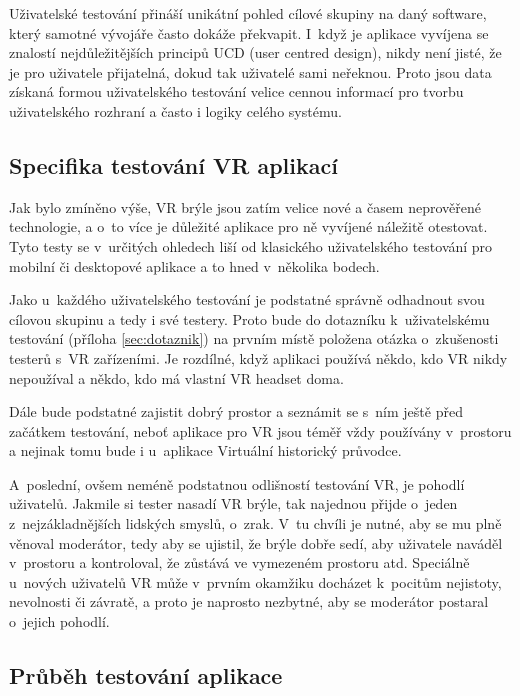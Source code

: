 \documentclass[thesis=B,czech]{FITthesis}[2012/06/26]
\begin{document}
	 Uživatelské testování přináší unikátní pohled cílové skupiny na daný software, který samotné vývojáře často dokáže překvapit. I~když je aplikace vyvíjena se znalostí nejdůležitějších principů UCD (user centred design), nikdy není jisté, že je pro uživatele přijatelná, dokud tak uživatelé sami neřeknou. Proto jsou data získaná formou uživatelského testování velice cennou informací pro tvorbu uživatelského rozhraní a často i logiky celého systému.
	
	\subsection{Specifika testování VR aplikací}
	
	Jak bylo zmíněno výše, VR brýle jsou zatím velice nové a časem neprověřené technologie, a o~to více je důležité aplikace pro ně vyvíjené náležitě otestovat. Tyto testy se v~určitých ohledech liší od klasického uživatelského testování pro mobilní či desktopové aplikace a to hned v~několika bodech.
	
	 Jako u~každého uživatelského testování je podstatné správně odhadnout svou cílovou skupinu a tedy i své testery. Proto bude do dotazníku k~uživatelskému testování (příloha \ref{sec:dotaznik}) na prvním místě položena otázka o~zkušenosti testerů s~VR zařízeními. Je rozdílné, když aplikaci používá někdo, kdo VR nikdy nepoužíval a někdo, kdo má vlastní VR headset doma.
	 
	 Dále bude podstatné zajistit dobrý prostor a seznámit se s~ním ještě před začátkem testování, neboť aplikace pro VR jsou téměř vždy používány v~prostoru a nejinak tomu bude i u~aplikace Virtuální historický průvodce.
	 
	 A~poslední, ovšem neméně podstatnou odlišností testování VR, je pohodlí uživatelů. Jakmile si tester nasadí VR brýle, tak najednou přijde o~jeden z~nejzákladnějších lidských smyslů, o~zrak. V~tu chvíli je nutné, aby se mu plně věnoval moderátor, tedy aby se ujistil, že brýle dobře sedí, aby uživatele naváděl v~prostoru a kontroloval, že zůstává ve vymezeném prostoru atd. Speciálně u~nových uživatelů VR může v~prvním okamžiku docházet k~pocitům nejistoty, nevolnosti či závratě, a proto je naprosto nezbytné, aby se moderátor postaral o~jejich pohodlí. \cite{VRuse}
	
	\subsection{Průběh testování aplikace}
	
\end{document}
